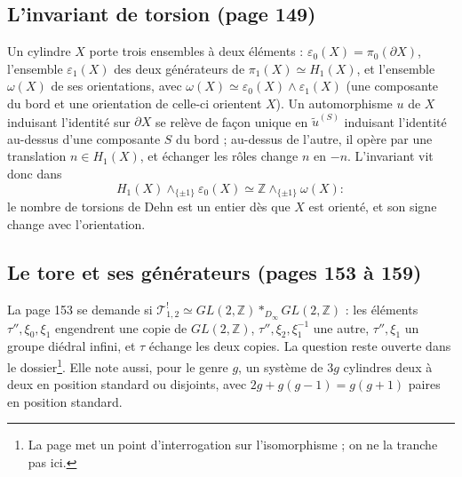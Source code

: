 \documentclass[11pt,a4paper]{article}
\begin{document}
\subsection*{L'invariant de torsion (page 149)}

Un cylindre $X$ porte trois ensembles à deux éléments : $\varepsilon_0(X) = \pi_0(\partial X)$,
l'ensemble $\varepsilon_1(X)$ des deux générateurs de $\pi_1(X) \simeq H_1(X)$,
et l'ensemble $\omega(X)$ de ses orientations, avec
$\omega(X) \simeq \varepsilon_0(X) \wedge \varepsilon_1(X)$ (une composante du bord
et une orientation de celle-ci orientent $X$). Un automorphisme $u$ de $X$
induisant l'identité sur $\partial X$ se relève de façon unique en $\tilde u^{(S)}$
induisant l'identité au-dessus d'une composante $S$ du bord ; au-dessus de
l'autre, il opère par une translation $n \in H_1(X)$, et échanger les rôles
change $n$ en $-n$. L'invariant vit donc dans
\[
H_1(X) \wedge_{\{\pm 1\}} \varepsilon_0(X) \simeq \mathbb{Z} \wedge_{\{\pm 1\}} \omega(X) :
\]
le nombre de torsions de Dehn est un entier dès que $X$ est orienté, et son
signe change avec l'orientation.

\subsection*{Le tore et ses générateurs (pages 153 à 159)}

La page 153 se demande si
$\mathcal{T}^{!}_{1,2} \simeq GL(2, \mathbb{Z}) *_{D_\infty} GL(2, \mathbb{Z})$ :
les éléments $\tau'', \xi_0, \xi_1$ engendrent une copie de $GL(2, \mathbb{Z})$,
$\tau'', \xi_2, \xi_1^{-1}$ une autre, $\tau'', \xi_1$ un groupe diédral infini,
et $\tau$ échange les deux copies. La question reste ouverte dans le
dossier\footnote{La page met un point d'interrogation sur l'isomorphisme ; on
ne la tranche pas ici.}. Elle note aussi, pour le genre $g$, un système de
$3g$ cylindres deux à deux en position standard ou disjoints, avec
$2g + g(g-1) = g(g+1)$ paires en position standard.
\end{document}
